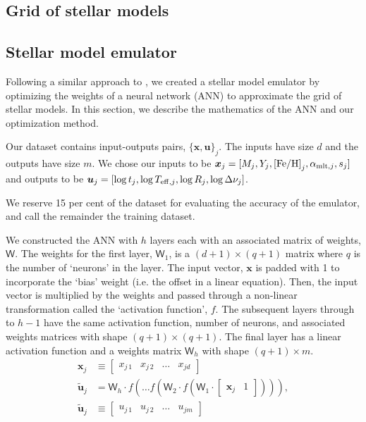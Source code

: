 \documentclass[fleqn,usenatbib]{mnras}
\renewcommand*{\vec}[1]{\boldsymbol{#1}}
\newcommand*{\mat}[1]{\boldsymbol{\mathsf{#1}}}
\newcommand{\inputs}{{\vec{x}}}
\newcommand{\outputs}{{\vec{u}}}
\newcommand{\pred}{{\tilde{\outputs}}}
\newcommand{\eep}{\ensuremath{s}}
\newcommand{\feh}{\ensuremath{\mathrm{[Fe/H]}}}
\newcommand{\mlt}[1][]{{\ensuremath{\alpha_{\mathrm{mlt} \ifx#1\empty \else , #1 \fi}}}}
\newcommand{\teff}[1][]{{\ensuremath{T_{\mathrm{eff} \ifx#1\empty \else , #1 \fi}}}}
\begin{document}
\subsection{Grid of stellar models}
\label{sec:grid}

\subsection{Stellar model emulator}
\label{sec:emulator}

Following a similar approach to \citet{Lyttle.Davies.ea2021}, we created a stellar model emulator by optimizing the weights of a neural network (ANN) to approximate the grid of stellar models. In this section, we describe the mathematics of the ANN and our optimization method.

Our dataset contains input-outputs pairs, \(\{\inputs, \outputs\}_j\). The inputs have size \(d\) and the outputs have size \(m\). We chose our inputs to be \(\inputs_j = [M_j, Y_j, \feh_j, \mlt[j], \eep_j]\) and outputs to be \(\outputs_j = [\log t_j, \log \teff[j], \log R_j, \log \Delta\nu_j]\).

We reserve 15 per cent of the dataset for evaluating the accuracy of the emulator, and call the remainder the training dataset.

We constructed the ANN with \(h\) layers each with an associated matrix of weights, \(\mat W\). The weights for the first layer, \(\mat W_1\), is a \((d + 1) \times (q + 1)\) matrix where \(q\) is the number of `neurons' in the layer. The input vector, \(\inputs\) is padded with 1 to incorporate the `bias' weight (i.e. the offset in a linear equation). Then, the input vector is multiplied by the weights and passed through a non-linear transformation called the `activation function', \(f\). The subsequent layers through to \(h-1\) have the same activation function, number of neurons, and associated weights matrices with shape \((q + 1) \times (q + 1)\). The final layer has a linear activation function and a weights matrix \(\mat W_h\) with shape \((q + 1) \times m\). 
%
%
%
\begin{align}
    \vec x_j &\equiv 
    \begin{bmatrix}
        x_{j\,1} & x_{j\,2} & \dots & x_{jd}
    \end{bmatrix}\\
    \pred_j &= \mat W_h \cdot f ( \dots f ( \mat W_2 \cdot f ( \mat W_1 \cdot
    \begin{bmatrix}
        \vec x_j & 1
    \end{bmatrix} 
    ) ) ),\\
    \pred_j &\equiv
    \begin{bmatrix}
        u_{j\,1} & u_{j\,2} & \dots & u_{jm}
    \end{bmatrix}
\end{align}
%
\end{document}
